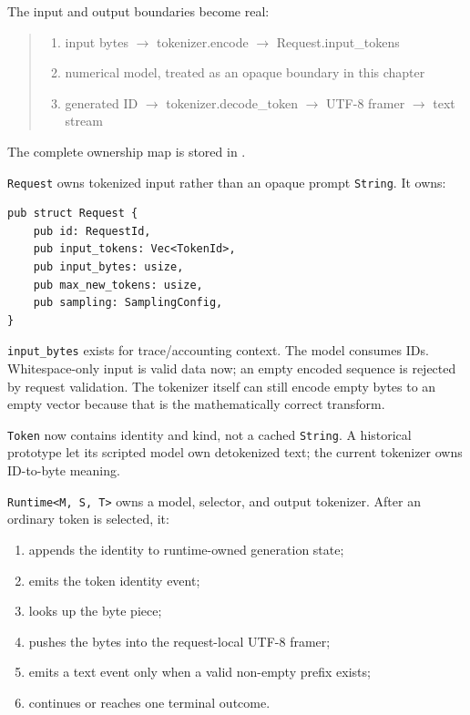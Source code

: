 The input and output boundaries become real:

\begin{quote}
\begin{enumerate}
\item input bytes  \(\longrightarrow\)  tokenizer.encode  \(\longrightarrow\)  Request.input\_tokens
\item numerical model, treated as an opaque boundary in this chapter
\item generated ID  \(\longrightarrow\)  tokenizer.decode\_token  \(\longrightarrow\)  UTF-8 framer  \(\longrightarrow\)  text stream
\end{enumerate}
\end{quote}

The complete ownership map is stored in
\href{https://github.com/hermonai/inside-the-llm-engine/blob/astra-visual-rewrite/diagrams/tokenizer/engine0-token-ownership.txt}{\texttt{}}.

\texttt{Request} owns tokenized input rather than an opaque prompt \texttt{String}. It
owns:

\begin{verbatim}
pub struct Request {
    pub id: RequestId,
    pub input_tokens: Vec<TokenId>,
    pub input_bytes: usize,
    pub max_new_tokens: usize,
    pub sampling: SamplingConfig,
}
\end{verbatim}

\texttt{input\_bytes} exists for trace/accounting context. The model
consumes IDs. Whitespace-only input is valid data now; an empty encoded
sequence is rejected by request validation. The tokenizer itself can
still encode empty bytes to an empty vector because that is the
mathematically correct transform.

\texttt{Token} now contains identity and kind, not a cached
\texttt{String}. A historical prototype let its scripted
model own detokenized text; the current tokenizer owns ID-to-byte
meaning.

\texttt{Runtime\textless{}M,\ S,\ T\textgreater{}} owns a model,
selector, and output tokenizer. After an ordinary token is selected, it:

\begin{enumerate}
\def\labelenumi{\arabic{enumi}.}
\tightlist
\item
  appends the identity to runtime-owned generation state;
\item
  emits the token identity event;
\item
  looks up the byte piece;
\item
  pushes the bytes into the request-local UTF-8 framer;
\item
  emits a text event only when a valid non-empty prefix exists;
\item
  continues or reaches one terminal outcome.
\end{enumerate}

